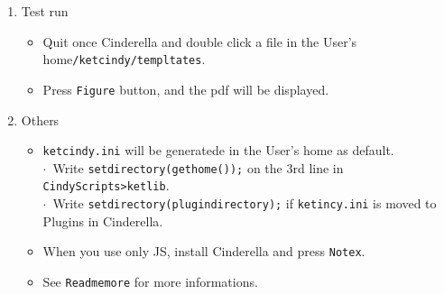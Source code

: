 \documentclass{article}
\begin{document}
\begin{enumerate}[\bf\large 1.]
\vspace{60mm}

\item Test run\vspace{-1mm}
\begin{itemize}
\item Quit once Cinderella and double click a file in the User's home\verb|/ketcindy/templtates|.\vspace{-1mm}
\item Press \verb|Figure| button, and the pdf will be displayed.\vspace{-1mm}
\end{itemize}

\item Others\vspace{-1mm}
\begin{itemize}
\item \verb|ketcindy.ini| will be generatede in the User's home as default.\\
\hspace*{5mm}$\cdot$\ Write \verb|setdirectory(gethome());| on the 3rd line in \verb|CindyScripts>ketlib|.\\
\hspace*{5mm}$\cdot$\ Write \verb|setdirectory(plugindirectory);| if \verb|ketincy.ini| is moved to Plugins in Cinderella.\vspace{-1mm}
\item When you use only \ketcindy JS, install Cinderella and press \verb|Notex|.\vspace{-1mm}
\item See \verb|Readmemore| for more informations.\vspace{-1mm}
\end{itemize}

  \end{enumerate}
\end{document}
